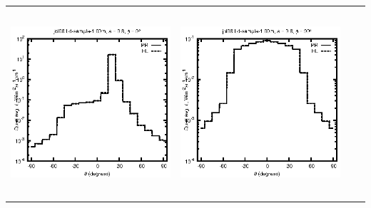\begin{tabular}{c c c c}
\includegraphics[height=7cm]{../eps/jol08_Ld_sample_1.00m_fwd.eps} &
\includegraphics[height=7cm]{../eps/jol08_Ld_sample_1.00m_cross.eps} \\
\end{tabular}

\pagebreak

